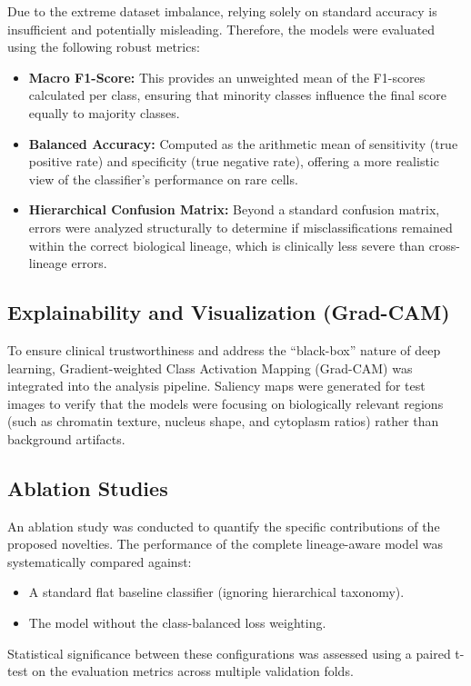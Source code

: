 \documentclass[11pt,a4paper]{article}
\begin{document}
Due to the extreme dataset imbalance, relying solely on standard accuracy is insufficient and potentially misleading. Therefore, the models were evaluated using the following robust metrics:
\begin{itemize}
    \item \textbf{Macro F1-Score:} This provides an unweighted mean of the F1-scores calculated per class, ensuring that minority classes influence the final score equally to majority classes.
    \item \textbf{Balanced Accuracy:} Computed as the arithmetic mean of sensitivity (true positive rate) and specificity (true negative rate), offering a more realistic view of the classifier's performance on rare cells.
    \item \textbf{Hierarchical Confusion Matrix:} Beyond a standard confusion matrix, errors were analyzed structurally to determine if misclassifications remained within the correct biological lineage, which is clinically less severe than cross-lineage errors.
\end{itemize}

\subsection{Explainability and Visualization (Grad-CAM)}

To ensure clinical trustworthiness and address the ``black-box'' nature of deep learning, Gradient-weighted Class Activation Mapping (Grad-CAM) was integrated into the analysis pipeline. Saliency maps were generated for test images to verify that the models were focusing on biologically relevant regions (such as chromatin texture, nucleus shape, and cytoplasm ratios) rather than background artifacts. 

\subsection{Ablation Studies}

An ablation study was conducted to quantify the specific contributions of the proposed novelties. The performance of the complete lineage-aware model was systematically compared against:
\begin{itemize}
    \item A standard flat baseline classifier (ignoring hierarchical taxonomy).
    \item The model without the class-balanced loss weighting.
\end{itemize}
Statistical significance between these configurations was assessed using a paired t-test on the evaluation metrics across multiple validation folds.
\end{document}

